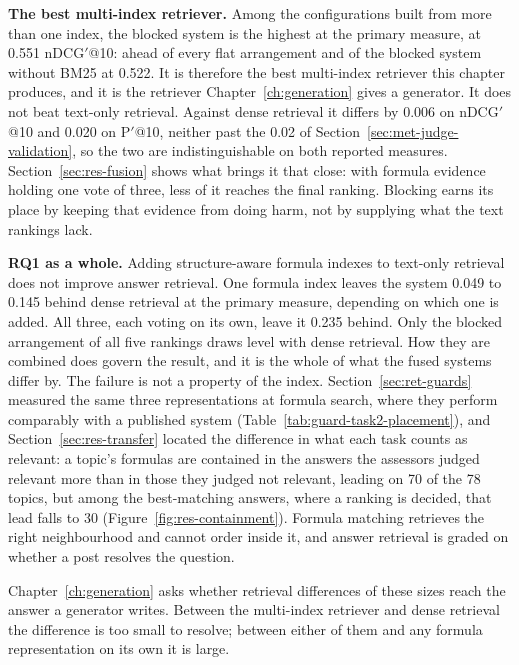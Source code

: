 \textbf{The best multi-index retriever.} Among the configurations built from more than one index,
the blocked system is the highest at the primary measure, at 0.551 nDCG$'$@10: ahead of every flat
arrangement and of the blocked system without BM25 at 0.522. It is therefore the best multi-index
retriever this chapter produces, and it is the retriever Chapter~\ref{ch:generation} gives a
generator. It does not beat text-only retrieval. Against dense retrieval it differs by 0.006 on
nDCG$'$@10 and 0.020 on P$'$@10, neither past the 0.02 of Section~\ref{sec:met-judge-validation},
so the two are indistinguishable on both reported measures. Section~\ref{sec:res-fusion} shows what
brings it that close: with formula evidence holding one vote of three, less of it reaches the final
ranking. Blocking earns its place by keeping that evidence from doing harm, not by supplying what
the text rankings lack.

\textbf{RQ1 as a whole.} Adding structure-aware formula indexes to text-only retrieval does not
improve answer retrieval. One formula index leaves the system 0.049 to 0.145 behind dense retrieval
at the primary measure, depending on which one is added. All three, each voting on its own, leave
it 0.235 behind. Only the blocked arrangement of all five rankings draws level with dense
retrieval. How they are combined does govern the result, and it is the whole of what the fused
systems differ by. The failure is not a property of the index. Section~\ref{sec:ret-guards}
measured the same three representations at formula search, where they perform comparably with a
published system (Table~\ref{tab:guard-task2-placement}), and Section~\ref{sec:res-transfer}
located the difference in what each task counts as relevant: a topic's formulas are contained in
the answers the assessors judged relevant more than in those they judged not relevant, leading on
70 of the 78 topics, but among the best-matching answers, where a ranking is decided, that lead
falls to 30 (Figure~\ref{fig:res-containment}). Formula matching retrieves the right neighbourhood
and cannot order inside it, and answer retrieval is graded on whether a post resolves the question.

Chapter~\ref{ch:generation} asks whether retrieval differences of these sizes reach the answer a
generator writes. Between the multi-index retriever and dense retrieval the difference is too small
to resolve; between either of them and any formula representation on its own it is large.
